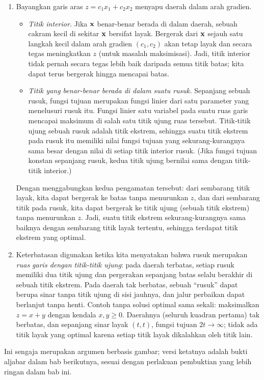 \begin{enumerate}
\item Bayangkan garis aras $z = c_1 x_1 + c_2 x_2$ menyapu daerah dalam arah gradien.
\begin{itemize}
\item \emph{Titik interior.} Jika $\mathbf{x}$ benar-benar berada di dalam daerah, sebuah cakram kecil di sekitar $\mathbf{x}$ bersifat layak. Bergerak dari $\mathbf{x}$ sejauh satu langkah kecil dalam arah gradien $(c_1, c_2)$ akan tetap layak dan secara tegas meningkatkan $z$ (untuk masalah maksimisasi). Jadi, titik interior tidak pernah secara tegas lebih baik daripada semua titik batas; kita dapat terus bergerak hingga mencapai batas.
\item \emph{Titik yang benar-benar berada di dalam suatu rusuk.} Sepanjang sebuah rusuk, fungsi tujuan merupakan fungsi linier dari satu parameter yang menelusuri rusuk itu. Fungsi linier satu variabel pada suatu ruas garis mencapai maksimum di salah satu titik ujung ruas tersebut. Titik-titik ujung sebuah rusuk adalah titik ekstrem, sehingga suatu titik ekstrem pada rusuk itu memiliki nilai fungsi tujuan yang sekurang-kurangnya sama besar dengan nilai di setiap titik interior rusuk. (Jika fungsi tujuan konstan sepanjang rusuk, kedua titik ujung bernilai sama dengan titik-titik interior.)
\end{itemize}
Dengan menggabungkan kedua pengamatan tersebut: dari sembarang titik layak, kita dapat bergerak ke batas tanpa menurunkan $z$, dan dari sembarang titik pada rusuk, kita dapat bergerak ke titik ujung (sebuah titik ekstrem) tanpa menurunkan $z$. Jadi, suatu titik ekstrem sekurang-kurangnya sama baiknya dengan sembarang titik layak tertentu, sehingga terdapat titik ekstrem yang optimal.
\item Keterbatasan digunakan ketika kita menyatakan bahwa rusuk merupakan \emph{ruas garis dengan titik-titik ujung}: pada daerah terbatas, setiap rusuk memiliki dua titik ujung dan pergerakan sepanjang batas selalu berakhir di sebuah titik ekstrem. Pada daerah tak berbatas, sebuah ``rusuk'' dapat berupa sinar tanpa titik ujung di sisi jauhnya, dan jalur perbaikan dapat berlanjut tanpa henti. Contoh tanpa solusi optimal sama sekali: maksimalkan $z = x + y$ dengan kendala $x, y \geq 0$. Daerahnya (seluruh kuadran pertama) tak berbatas, dan sepanjang sinar layak $(t,t)$, fungsi tujuan $2t \to \infty$; tidak ada titik layak yang optimal karena setiap titik layak dikalahkan oleh titik lain.
\end{enumerate}
Ini sengaja merupakan argumen berbasis gambar; versi ketatnya adalah bukti aljabar dalam bab berikutnya, sesuai dengan perlakuan pembuktian yang lebih ringan dalam bab ini.


